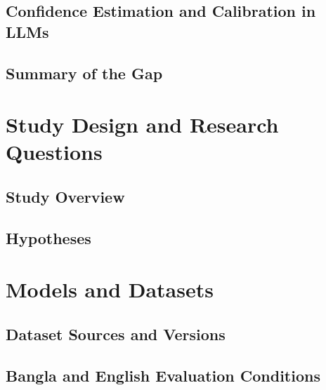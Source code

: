 \documentclass[runningheads]{llncs}
\begin{document}
\subsection{Confidence Estimation and Calibration in LLMs}

\subsection{Summary of the Gap}

\section{Study Design and Research Questions}
\subsection{Study Overview}

\subsection{Hypotheses}

\section{Models and Datasets}
\subsection{Dataset Sources and Versions}

\subsection{Bangla and English Evaluation Conditions}
\end{document}
